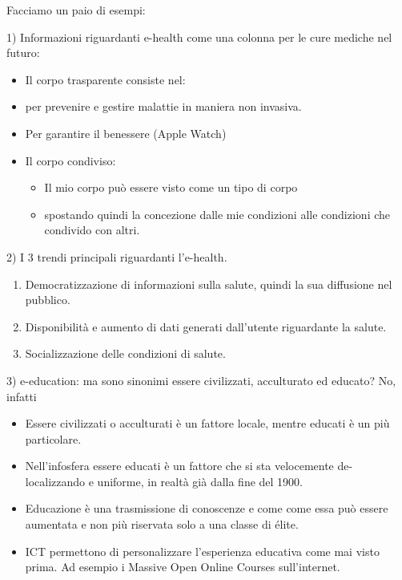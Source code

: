 \documentclass[a4page, 11pt]{article}
\begin{document}
Facciamo un paio di esempi:

1) Informazioni riguardanti e-health come una colonna per le cure
mediche nel futuro:

\begin{itemize}
	 
	\item
	Il corpo trasparente consiste nel:
\end{itemize}

\begin{itemize}
	 
	\item
	per prevenire e gestire malattie in maniera non invasiva.
	\item
	Per garantire il benessere (Apple Watch)
\end{itemize}

\begin{itemize}
	\item
	Il corpo condiviso:
	
	\begin{itemize}
		 
		\item
		Il mio corpo può essere visto come un tipo di corpo
		\item
		spostando quindi la concezione dalle mie condizioni alle condizioni
		che condivido con altri.
	\end{itemize}
\end{itemize}

2) I 3 trendi principali riguardanti l'e-health.

\begin{enumerate}
	\def\labelenumi{\arabic{enumi}.}
	 
	\item
	Democratizzazione di informazioni sulla salute, quindi la sua
	diffusione nel pubblico.
	\item
	Disponibilità e aumento di dati generati dall'utente riguardante la salute.
	\item
	Socializzazione delle condizioni di salute.
\end{enumerate}

3) e-education: ma sono sinonimi essere civilizzati, acculturato ed
educato? No, infatti

\begin{itemize}
	 
	\item
	Essere civilizzati o acculturati è un fattore locale, mentre educati è
	un più particolare.
	\item
	Nell'infosfera essere educati è un fattore che si sta velocemente
	de-localizzando e uniforme, in realtà già dalla fine del 1900.
	\item
	Educazione è una trasmissione di conoscenze e come come essa può
	essere aumentata e non più riservata solo a una classe di élite.
	\item
	ICT permettono di personalizzare l'esperienza educativa come mai visto
	prima. Ad esempio i Massive Open Online Courses sull'internet.
\end{itemize}
\end{document}
